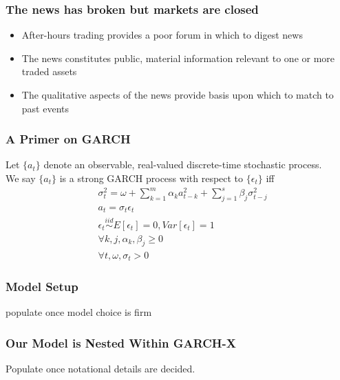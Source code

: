 \documentclass{beamer}
\newcommand{\simiid}{\stackrel{iid}{\sim}} %
\theoremstyle{definition}
\begin{document}

\begin{frame}
\frametitle{The news has broken but markets are closed}

\begin{itemize}
\item After-hours trading provides a poor forum in which to digest news
\item The news constitutes public, material information relevant to one or more traded assets
\item The qualitative aspects of the news provide basis upon which to match to past events

\end{itemize}
\end{frame}

\begin{frame}
    \frametitle{A Primer on GARCH}

    Let $\{a_{t}\}$ denote an observable, real-valued discrete-time stochastic process.\\
    

    We say $\{a_{t}\}$ is a strong GARCH process with respect to $\{\epsilon_{t}\}$ iff 
    \begin{align*}
        &\sigma_{t}^{2} = \omega + \sum^{m}_{k=1}\alpha_{k}a^{2}_{t-k} + \sum_{j=1}^{s}\beta_{j}\sigma_{t-j}^{2}\\
        &a_{t} = \sigma_{t}\epsilon_{t}\\
        &\epsilon_{t} \simiid E[\epsilon_{t}]=0, Var[\epsilon_{t}] = 1\\
        &\forall k,j, \alpha_{k},\beta_{j}\geq 0\\ 
        &\forall t, \omega, \sigma_{t} > 0 
        \end{align*}
\end{frame}

\begin{frame}
\frametitle{Model Setup}
populate once model choice is firm
\end{frame}

\begin{frame}
\frametitle{Our Model is Nested Within GARCH-X}

Populate once notational details are decided.

\end{frame}
\end{document}
